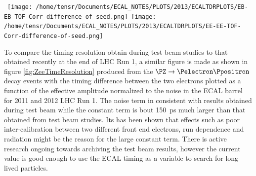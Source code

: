 \begin{center}
\centering
\mbox{
\texttt{[image: /home/tensr/Documents/ECAL\_NOTES/PLOTS/2013/ECALTDRPLOTS/EB-EB-TOF-Corr-difference-of-seed.png]}\quad
\texttt{[image: /home/tensr/Documents/ECAL\_NOTES/PLOTS/2013/ECALTDRPLOTS/EE-EE-TOF-Corr-difference-of-seed.png]}}
\label{fig:ZeeTimePerformance}
\end{center}
To compare the timing resolution obtain during test beam studies to that obtained recently at the end of LHC Run 1, a similar figure is made as shown in figure \ref{fig:ZeeTimeResolution} produced from the $\PZ \rightarrow \Pelectron \Ppositron$ decay events with the timing difference between the two electrons plotted as a function of the effective amplitude normalized to the noise in the ECAL barrel for 2011 and 2012 LHC Run 1. The noise term in consistent with results obtained during test beam while the constant term is bout 150~ps much larger than that obtained from test beam studies. Its has been shown that effects such as poor inter-calibration between two different front end electrons, run dependence and radiation might be the reason for the  large constant term. There is active research ongoing towards archiving the test beam results, however the current value is good enough to use the ECAL timing as a variable to search for long-lived particles.
